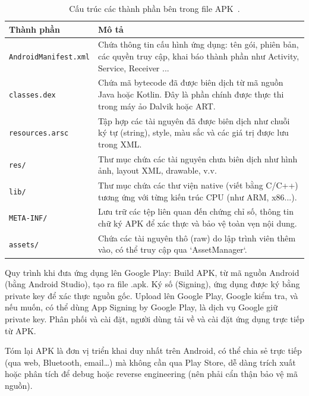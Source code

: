         \begin{table}[H]
            \centering
            \renewcommand{\arraystretch}{1.5}
            \begin{tabular}{|l|p{8cm}|}
                \hline
                \textbf{Thành phần} & \textbf{Mô tả} \\
                \hline
                \texttt{AndroidManifest.xml} & Chứa thông tin cấu hình ứng dụng: tên gói, phiên bản, các quyền truy cập, khai báo thành phần như Activity, Service, Receiver \cite{AndroidManifest.xml}... \\
                \hline
                \texttt{classes.dex} & Chứa mã bytecode đã được biên dịch từ mã nguồn Java hoặc Kotlin. Đây là phần chính được thực thi trong máy ảo Dalvik hoặc ART. \\
                \hline
                \texttt{resources.arsc} & Tập hợp các tài nguyên đã được biên dịch như chuỗi ký tự (string), style, màu sắc và các giá trị được lưu trong XML. \\
                \hline
                \texttt{res/} & Thư mục chứa các tài nguyên chưa biên dịch như hình ảnh, layout XML, drawable, v.v. \\
                \hline
                \texttt{lib/} & Thư mục chứa các thư viện native (viết bằng C/C++) tương ứng với từng kiến trúc CPU (như ARM, x86...). \\
                \hline
                \texttt{META-INF/} & Lưu trữ các tệp liên quan đến chứng chỉ số, thông tin chữ ký APK để xác thực và bảo vệ toàn vẹn nội dung. \\
                \hline
                \texttt{assets/} & Chứa các tài nguyên thô (raw) do lập trình viên thêm vào, có thể truy cập qua `AssetManager`. \\
                \hline
            \end{tabular}
            \caption{Cấu trúc các thành phần bên trong file APK~\cite{apk-file}.}
            \label{table:apk-structure}
            \end{table}            
    
        Quy trình khi đưa ứng dụng lên Google Play: Build APK, từ mã nguồn Android (bằng Android Studio), tạo ra file .apk. Ký số (Signing), ứng dụng được ký bằng private key để xác thực nguồn gốc. Upload lên Google Play, Google kiểm tra, và nếu muốn, có thể dùng App Signing by Google Play, là dịch vụ Google giữ private key. Phân phối và cài đặt, người dùng tải về và cài đặt ứng dụng trực tiếp từ APK.
        
        \vspace{0.5em}

        Tóm lại APK là đơn vị triển khai duy nhất trên Android, có thể chia sẻ trực tiếp (qua web, Bluetooth, email…) mà không cần qua Play Store, dễ dàng trích xuất hoặc phân tích để debug hoặc reverse engineering (nên phải cẩn thận bảo vệ mã nguồn).
